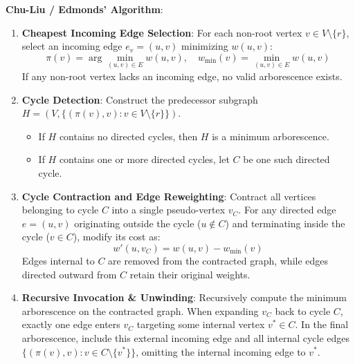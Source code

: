 \documentclass[12pt]{article}
\begin{document}
\textbf{Chu-Liu / Edmonds' Algorithm}:
\begin{enumerate}
    \item \textbf{Cheapest Incoming Edge Selection}: For each non-root vertex $v \in V \setminus \{r\}$, select an incoming edge $e_v = (u, v)$ minimizing $w(u, v)$:
    \[
    \pi(v) = \arg\min_{(u, v) \in E} w(u, v), \quad w_{\min}(v) = \min_{(u, v) \in E} w(u, v)
    \]
    If any non-root vertex lacks an incoming edge, no valid arborescence exists.
    \item \textbf{Cycle Detection}: Construct the predecessor subgraph $H = (V, \{(\pi(v), v) : v \in V \setminus \{r\}\})$.
    \begin{itemize}
        \item If $H$ contains no directed cycles, then $H$ is a minimum arborescence.
        \item If $H$ contains one or more directed cycles, let $C$ be one such directed cycle.
    \end{itemize}
    \item \textbf{Cycle Contraction and Edge Reweighting}:
    Contract all vertices belonging to cycle $C$ into a single pseudo-vertex $v_C$.
    For any directed edge $e = (u, v)$ originating outside the cycle ($u \notin C$) and terminating inside the cycle ($v \in C$), modify its cost as:
    \[
    w'(u, v_C) = w(u, v) - w_{\min}(v)
    \]
    Edges internal to $C$ are removed from the contracted graph, while edges directed outward from $C$ retain their original weights.
    \item \textbf{Recursive Invocation \& Unwinding}: Recursively compute the minimum arborescence on the contracted graph. When expanding $v_C$ back to cycle $C$, exactly one edge enters $v_C$ targeting some internal vertex $v^* \in C$. In the final arborescence, include this external incoming edge and all internal cycle edges $\{(\pi(v), v) : v \in C \setminus \{v^*\}\}$, omitting the internal incoming edge to $v^*$.
\end{enumerate}
\end{document}
